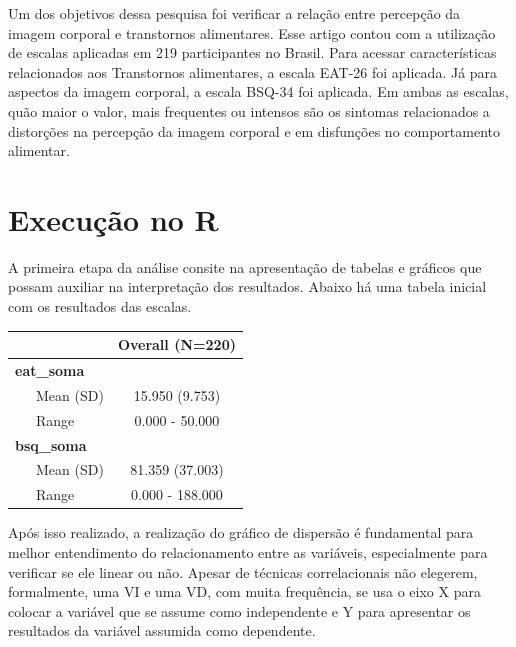 \documentclass[
]{book}
\newenvironment{Shaded}{\begin{snugshade}}{\end{snugshade}}
\newcommand{\DataTypeTok}[1]{\textcolor[rgb]{0.13,0.29,0.53}{#1}}
\newcommand{\KeywordTok}[1]{\textcolor[rgb]{0.13,0.29,0.53}{\textbf{#1}}}
\newcommand{\NormalTok}[1]{#1}
\newcommand{\OperatorTok}[1]{\textcolor[rgb]{0.81,0.36,0.00}{\textbf{#1}}}
\newcommand{\OtherTok}[1]{\textcolor[rgb]{0.56,0.35,0.01}{#1}}
\newcommand{\StringTok}[1]{\textcolor[rgb]{0.31,0.60,0.02}{#1}}
\begin{document}
Um dos objetivos dessa pesquisa foi verificar a relação entre percepção
da imagem corporal e transtornos alimentares. Esse artigo contou com a
utilização de escalas aplicadas em 219 participantes no Brasil. Para
acessar características relacionados aos Transtornos alimentares, a
escala EAT-26 foi aplicada. Já para aspectos da imagem corporal, a
escala BSQ-34 foi aplicada. Em ambas as escalas, quão maior o valor,
mais frequentes ou intensos são os sintomas relacionados a distorções na
percepção da imagem corporal e em disfunções no comportamento alimentar.

\hypertarget{execuuxe7uxe3o-no-r-12}{%
\section{Execução no R}\label{execuuxe7uxe3o-no-r-12}}

A primeira etapa da análise consite na apresentação de tabelas e
gráficos que possam auxiliar na interpretação dos resultados. Abaixo há
uma tabela inicial com os resultados das escalas.

\begin{Shaded}
\end{Shaded}

\begin{longtable}[]{@{}lc@{}}
\toprule
& Overall (N=220)\tabularnewline
\midrule
\endhead
\textbf{eat\_soma} &\tabularnewline
~~~Mean (SD) & 15.950 (9.753)\tabularnewline
~~~Range & 0.000 - 50.000\tabularnewline
\textbf{bsq\_soma} &\tabularnewline
~~~Mean (SD) & 81.359 (37.003)\tabularnewline
~~~Range & 0.000 - 188.000\tabularnewline
\bottomrule
\end{longtable}

Após isso realizado, a realização do gráfico de dispersão é fundamental
para melhor entendimento do relacionamento entre as variáveis,
especialmente para verificar se ele linear ou não. Apesar de técnicas
correlacionais não elegerem, formalmente, uma VI e uma VD, com muita
frequência, se usa o eixo X para colocar a variável que se assume como
independente e Y para apresentar os resultados da variável assumida como
dependente.
\end{document}
